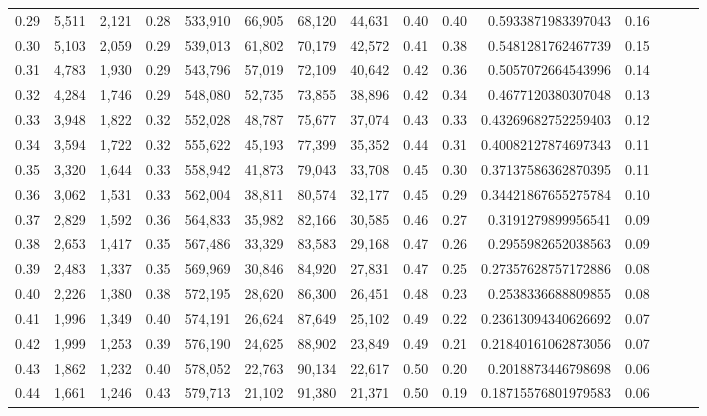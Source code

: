 \begin{tabular}{rrrrrrrrrrrrrrr}
0.29 &   5,511 &  2,121 &  0.28 &  533,910 &   66,905 &   68,120 &   44,631 &  0.40 &  0.40 &      0.5933871983397043 &      0.16 \\
0.30 &   5,103 &  2,059 &  0.29 &  539,013 &   61,802 &   70,179 &   42,572 &  0.41 &  0.38 &      0.5481281762467739 &      0.15 \\
0.31 &   4,783 &  1,930 &  0.29 &  543,796 &   57,019 &   72,109 &   40,642 &  0.42 &  0.36 &      0.5057072664543996 &      0.14 \\
0.32 &   4,284 &  1,746 &  0.29 &  548,080 &   52,735 &   73,855 &   38,896 &  0.42 &  0.34 &      0.4677120380307048 &      0.13 \\
0.33 &   3,948 &  1,822 &  0.32 &  552,028 &   48,787 &   75,677 &   37,074 &  0.43 &  0.33 &     0.43269682752259403 &      0.12 \\
0.34 &   3,594 &  1,722 &  0.32 &  555,622 &   45,193 &   77,399 &   35,352 &  0.44 &  0.31 &     0.40082127874697343 &      0.11 \\
0.35 &   3,320 &  1,644 &  0.33 &  558,942 &   41,873 &   79,043 &   33,708 &  0.45 &  0.30 &     0.37137586362870395 &      0.11 \\
0.36 &   3,062 &  1,531 &  0.33 &  562,004 &   38,811 &   80,574 &   32,177 &  0.45 &  0.29 &     0.34421867655275784 &      0.10 \\
0.37 &   2,829 &  1,592 &  0.36 &  564,833 &   35,982 &   82,166 &   30,585 &  0.46 &  0.27 &      0.3191279899956541 &      0.09 \\
0.38 &   2,653 &  1,417 &  0.35 &  567,486 &   33,329 &   83,583 &   29,168 &  0.47 &  0.26 &      0.2955982652038563 &      0.09 \\
0.39 &   2,483 &  1,337 &  0.35 &  569,969 &   30,846 &   84,920 &   27,831 &  0.47 &  0.25 &     0.27357628757172886 &      0.08 \\
0.40 &   2,226 &  1,380 &  0.38 &  572,195 &   28,620 &   86,300 &   26,451 &  0.48 &  0.23 &      0.2538336688809855 &      0.08 \\
0.41 &   1,996 &  1,349 &  0.40 &  574,191 &   26,624 &   87,649 &   25,102 &  0.49 &  0.22 &     0.23613094340626692 &      0.07 \\
0.42 &   1,999 &  1,253 &  0.39 &  576,190 &   24,625 &   88,902 &   23,849 &  0.49 &  0.21 &     0.21840161062873056 &      0.07 \\
0.43 &   1,862 &  1,232 &  0.40 &  578,052 &   22,763 &   90,134 &   22,617 &  0.50 &  0.20 &      0.2018873446798698 &      0.06 \\
0.44 &   1,661 &  1,246 &  0.43 &  579,713 &   21,102 &   91,380 &   21,371 &  0.50 &  0.19 &     0.18715576801979583 &      0.06 \\

\end{tabular}
